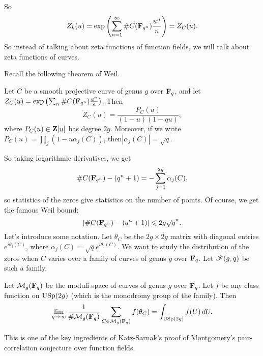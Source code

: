 So 
\[
  Z_k(u) = \exp\left(\sum_{n=1}^\infty \# C(\mathbf{F}_{q^n}) \frac{u^n}{n}\right) = Z_C(u) .
\]
So instead of talking about zeta functions of function fields, we will talk about 
zeta functions of curves. 

Recall the following theorem of Weil. 

\begin{theorem}[Weil]
Let $C$ be a smooth projective curve of genus $g$ over $\mathbf{F}_q$, and let 
$Z_C(u) = \exp\left(\sum_n \# C(\mathbf{F}_{q^n}) \frac{u^n}{n}\right)$. Then 
\[
  Z_C(u) = \frac{P_C(u)}{(1-u)(1-q u)} ,
\]
where $P_C(u)\in \mathbf{Z}[u]$ has degree $2 g$. Moreover, if we write 
$P_C(u) = \prod_j (1-u \alpha_j(C))$, then$|\alpha_j(C)| = \sqrt q$. 
\end{theorem}

So taking logarithmic derivatives, we get 
\[
  \# C(\mathbf{F}_{q^n}) - (q^n+1) = -\sum_{j=1}^{2 g} \alpha_j(C) ,
\]
so statistics of the zeros give statistics on the number of points. Of course, 
we get the famous Weil bound: 
\[
  |\# C(\mathbf{F}_{q^n}) - (q^n+1)| \leqslant 2 g\sqrt q^n .
\]
Let's introduce some notation. Let $\theta_C$ be the $2 g\times 2 g$ matrix 
with diagonal entries $e^{i\theta_j(C)}$, where 
$\alpha_j(C) = \sqrt q e^{i\theta_j(C)}$. We want to study the distribution of 
the zeros when $C$ varies over a family of curves of genus $g$ over 
$\mathbf{F}_q$. Let $\mathscr{F}(g,q)$ be such a family. 

\begin{theorem}[Deligne]
Let $\mathcal{M}_g(\mathbf{F}_q)$ be the moduli space of curves of genus $g$ over $\mathbf{F}_q$. Let 
$f$ be any class function on $\operatorname{USp}(2 g)$ (which is the monodromy 
group of the family). Then 
\[
  \lim_{q\to \infty}\frac{1}{\# \mathcal{M}_g(\mathbf{F}_q)} \sum_{C\in \mathcal{M}_g(\mathbf{F}_q)} f(\theta_C) = \int_{\operatorname{USp}(2 g)} f(U)\, d U .
\]
\end{theorem}

This is one of the key ingredients of Katz-Sarnak's proof of Montgomery's 
pair-correlation conjecture over function fields. 

